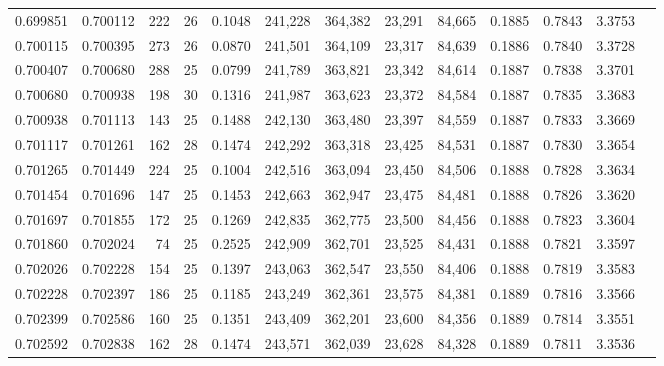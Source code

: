 \begin{tabular}{rrrrrrrrrrrrr}
0.699851 & 0.700112 &   222 &  26 &                                     0.1048 & 241,228 & 364,382 &  23,291 &  84,665 & 0.1885 & 0.7843 & 3.3753 \\
0.700115 & 0.700395 &   273 &  26 &                                     0.0870 & 241,501 & 364,109 &  23,317 &  84,639 & 0.1886 & 0.7840 & 3.3728 \\
0.700407 & 0.700680 &   288 &  25 &                                     0.0799 & 241,789 & 363,821 &  23,342 &  84,614 & 0.1887 & 0.7838 & 3.3701 \\
0.700680 & 0.700938 &   198 &  30 &                                     0.1316 & 241,987 & 363,623 &  23,372 &  84,584 & 0.1887 & 0.7835 & 3.3683 \\
0.700938 & 0.701113 &   143 &  25 &                                     0.1488 & 242,130 & 363,480 &  23,397 &  84,559 & 0.1887 & 0.7833 & 3.3669 \\
0.701117 & 0.701261 &   162 &  28 &                                     0.1474 & 242,292 & 363,318 &  23,425 &  84,531 & 0.1887 & 0.7830 & 3.3654 \\
0.701265 & 0.701449 &   224 &  25 &                                     0.1004 & 242,516 & 363,094 &  23,450 &  84,506 & 0.1888 & 0.7828 & 3.3634 \\
0.701454 & 0.701696 &   147 &  25 &                                     0.1453 & 242,663 & 362,947 &  23,475 &  84,481 & 0.1888 & 0.7826 & 3.3620 \\
0.701697 & 0.701855 &   172 &  25 &                                     0.1269 & 242,835 & 362,775 &  23,500 &  84,456 & 0.1888 & 0.7823 & 3.3604 \\
0.701860 & 0.702024 &    74 &  25 &                                     0.2525 & 242,909 & 362,701 &  23,525 &  84,431 & 0.1888 & 0.7821 & 3.3597 \\
0.702026 & 0.702228 &   154 &  25 &                                     0.1397 & 243,063 & 362,547 &  23,550 &  84,406 & 0.1888 & 0.7819 & 3.3583 \\
0.702228 & 0.702397 &   186 &  25 &                                     0.1185 & 243,249 & 362,361 &  23,575 &  84,381 & 0.1889 & 0.7816 & 3.3566 \\
0.702399 & 0.702586 &   160 &  25 &                                     0.1351 & 243,409 & 362,201 &  23,600 &  84,356 & 0.1889 & 0.7814 & 3.3551 \\
0.702592 & 0.702838 &   162 &  28 &                                     0.1474 & 243,571 & 362,039 &  23,628 &  84,328 & 0.1889 & 0.7811 & 3.3536 \\

\end{tabular}

